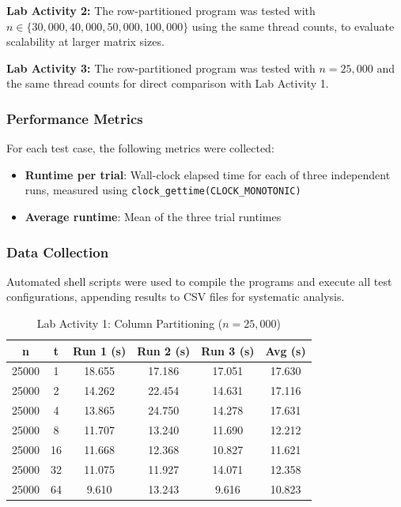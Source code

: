 \documentclass[journal]{IEEEtran}
\begin{document}
\textbf{Lab Activity 2:} The row-partitioned program was tested with $n \in \{30{,}000, 40{,}000, 50{,}000, 100{,}000\}$ using the same thread counts, to evaluate scalability at larger matrix sizes.

\textbf{Lab Activity 3:} The row-partitioned program was tested with $n = 25{,}000$ and the same thread counts for direct comparison with Lab Activity 1.


\subsubsection{Performance Metrics}

For each test case, the following metrics were collected:
\begin{itemize}
    \item \textbf{Runtime per trial}: Wall-clock elapsed time for each of three independent runs, measured using \texttt{clock\_gettime(CLOCK\_MONOTONIC)}
    \item \textbf{Average runtime}: Mean of the three trial runtimes
\end{itemize}

\subsubsection{Data Collection}

Automated shell scripts were used to compile the programs and execute all test configurations, appending results to CSV files for systematic analysis.

\begin{table}[H]
    \centering
    \caption{Lab Activity 1: Column Partitioning ($n = 25{,}000$)}
    \label{tab:act1_results}
    \footnotesize
    \begin{tabular}{|c|c|c|c|c|c|}
        \hline
        \textbf{n} & \textbf{t} & \textbf{Run 1 (s)} & \textbf{Run 2 (s)} & \textbf{Run 3 (s)} & \textbf{Avg (s)} \\
        \hline
        25000 & 1  & 18.655 & 17.186 & 17.051 & 17.630 \\
        \hline
        25000 & 2  & 14.262 & 22.454 & 14.631 & 17.116 \\
        \hline
        25000 & 4  & 13.865 & 24.750 & 14.278 & 17.631 \\
        \hline
        25000 & 8  & 11.707 & 13.240 & 11.690 & 12.212 \\
        \hline
        25000 & 16 & 11.668 & 12.368 & 10.827 & 11.621 \\
        \hline
        25000 & 32 & 11.075 & 11.927 & 14.071 & 12.358 \\
        \hline
        25000 & 64 & 9.610  & 13.243 & 9.616  & 10.823 \\
        \hline
    \end{tabular}
\end{table}
\end{document}
